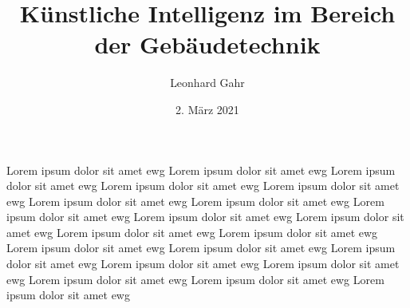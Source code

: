 \documentclass[
	ngerman,
	12pt, %
]{pm}
\title{Künstliche Intelligenz im Bereich der Gebäudetechnik}
\author{Leonhard Gahr} %
\date{2. März 2021} %
\institute{\texttt{[image: ../img/sie-logo.png]}\hfill\texttt{[image: ../img/dhbw-logo]}} %
\begin{document}
\maketitle %


\section*{}

Lorem ipsum dolor sit amet ewg Lorem ipsum dolor sit amet ewg Lorem ipsum dolor sit amet ewg Lorem ipsum dolor sit amet ewg Lorem ipsum dolor sit amet ewg Lorem ipsum dolor sit amet ewg Lorem ipsum dolor sit amet ewg Lorem ipsum dolor sit amet ewg Lorem ipsum dolor sit amet ewg Lorem ipsum dolor sit amet ewg Lorem ipsum dolor sit amet ewg Lorem ipsum dolor sit amet ewg Lorem ipsum dolor sit amet ewg Lorem ipsum dolor sit amet ewg Lorem ipsum dolor sit amet ewg Lorem ipsum dolor sit amet ewg Lorem ipsum dolor sit amet ewg Lorem ipsum dolor sit amet ewg Lorem ipsum dolor sit amet ewg Lorem ipsum dolor sit amet ewg
\end{document}
